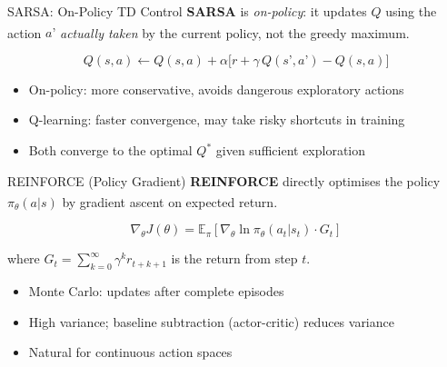 \begin{v3topic}{SARSA: On-Policy TD Control}
    \textbf{SARSA} is \emph{on-policy}: it updates $Q$ using the action $a’$
    \emph{actually taken} by the current policy, not the greedy
    maximum.\textsuperscript{\cite[][Ch.~6]{suttonReinforcementLearningIntroduction2018}}

    \begin{equation}
        Q(s,a) \leftarrow Q(s,a) + \alpha\bigl[r + \gamma\,Q(s’,a’) - Q(s,a)\bigr]
    \end{equation}

    \begin{itemize}
        \item On-policy: more conservative, avoids dangerous exploratory actions
        \item Q-learning: faster convergence, may take risky shortcuts in training
        \item Both converge to the optimal $Q^*$ given sufficient exploration
    \end{itemize}

\end{v3topic}
\begin{v3topic}{REINFORCE (Policy Gradient)}
    \textbf{REINFORCE} directly optimises the policy $\pi_\theta(a|s)$ by
    gradient ascent on expected
    return.\textsuperscript{\cite[][Ch.~13]{suttonReinforcementLearningIntroduction2018}}

    \begin{equation}
        \nabla_\theta J(\theta) = \mathbb{E}_\pi\!\left[
            \nabla_\theta \ln \pi_\theta(a_t|s_t) \cdot G_t\right]
    \end{equation}

    where $G_t = \sum_{k=0}^{\infty} \gamma^k r_{t+k+1}$ is the return from step $t$.

    \begin{itemize}
        \item Monte Carlo: updates after complete episodes
        \item High variance; baseline subtraction (actor-critic) reduces variance
        \item Natural for continuous action spaces
    \end{itemize}

\end{v3topic}

